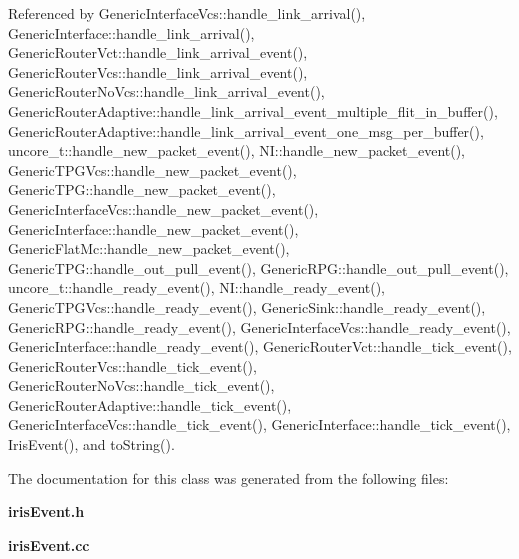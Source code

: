 Referenced by GenericInterfaceVcs::handle\_\-link\_\-arrival(), GenericInterface::handle\_\-link\_\-arrival(), GenericRouterVct::handle\_\-link\_\-arrival\_\-event(), GenericRouterVcs::handle\_\-link\_\-arrival\_\-event(), GenericRouterNoVcs::handle\_\-link\_\-arrival\_\-event(), GenericRouterAdaptive::handle\_\-link\_\-arrival\_\-event\_\-multiple\_\-flit\_\-in\_\-buffer(), GenericRouterAdaptive::handle\_\-link\_\-arrival\_\-event\_\-one\_\-msg\_\-per\_\-buffer(), uncore\_\-t::handle\_\-new\_\-packet\_\-event(), NI::handle\_\-new\_\-packet\_\-event(), GenericTPGVcs::handle\_\-new\_\-packet\_\-event(), GenericTPG::handle\_\-new\_\-packet\_\-event(), GenericInterfaceVcs::handle\_\-new\_\-packet\_\-event(), GenericInterface::handle\_\-new\_\-packet\_\-event(), GenericFlatMc::handle\_\-new\_\-packet\_\-event(), GenericTPG::handle\_\-out\_\-pull\_\-event(), GenericRPG::handle\_\-out\_\-pull\_\-event(), uncore\_\-t::handle\_\-ready\_\-event(), NI::handle\_\-ready\_\-event(), GenericTPGVcs::handle\_\-ready\_\-event(), GenericSink::handle\_\-ready\_\-event(), GenericRPG::handle\_\-ready\_\-event(), GenericInterfaceVcs::handle\_\-ready\_\-event(), GenericInterface::handle\_\-ready\_\-event(), GenericRouterVct::handle\_\-tick\_\-event(), GenericRouterVcs::handle\_\-tick\_\-event(), GenericRouterNoVcs::handle\_\-tick\_\-event(), GenericRouterAdaptive::handle\_\-tick\_\-event(), GenericInterfaceVcs::handle\_\-tick\_\-event(), GenericInterface::handle\_\-tick\_\-event(), IrisEvent(), and toString().

The documentation for this class was generated from the following files:\begin{CompactItemize}
\item 
{\bf irisEvent.h}\item 
{\bf irisEvent.cc}\end{CompactItemize}
